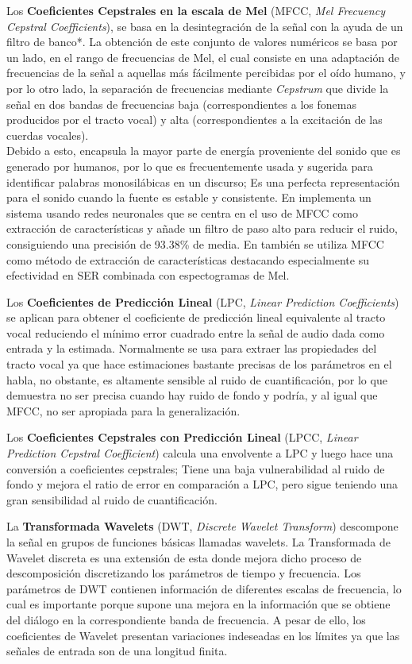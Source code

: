 \documentclass[11pt,a4paper,spanish]{book}
\begin{document}
	Los \textbf{Coeficientes Cepstrales en la escala de Mel} (MFCC, \emph{Mel Frecuency Cepstral Coefficients}), se basa en la desintegración de la señal con la ayuda de un filtro de banco*. La obtención de este conjunto de valores numéricos se basa por un lado, en el rango de frecuencias de Mel, el cual consiste en una adaptación de frecuencias de la señal a aquellas más fácilmente percibidas por el oído humano, y por lo otro lado, la separación de frecuencias mediante \emph{Cepstrum} que divide la señal en dos bandas de frecuencias baja (correspondientes a los fonemas producidos por el tracto vocal) y alta (correspondientes a la excitación de las cuerdas vocales).\\
	Debido a esto, encapsula la mayor parte de energía proveniente del sonido que es generado por humanos, por lo que es frecuentemente usada y sugerida para identificar palabras monosilábicas en un discurso; Es una perfecta representación para el sonido cuando la fuente es estable y consistente. En \cite{Sarkania2013} implementa un sistema usando redes neuronales que se centra en el uso de MFCC como extracción de características y añade un filtro  de paso alto para reducir el ruido, consiguiendo una precisión de 93.38\% de media. En \cite{Wang2020} también se utiliza MFCC como método de extracción de características destacando especialmente su efectividad en SER combinada con espectogramas de Mel.\hfill \break
	
	Los \textbf{Coeficientes de Predicción Lineal} (LPC, \emph{Linear Prediction Coefficients}) se aplican para obtener el coeficiente de predicción lineal equivalente al tracto vocal reduciendo el mínimo error cuadrado entre la señal de audio dada como entrada y la estimada. Normalmente se usa para extraer las propiedades del tracto vocal ya que hace estimaciones bastante precisas de los parámetros en el habla, no obstante, es altamente sensible al ruido de cuantificación, por lo que demuestra no ser precisa cuando hay ruido de fondo y podría, y al igual que MFCC, no ser apropiada para la generalización.\hfill \break
	
	 Los \textbf{Coeficientes Cepstrales con Predicción Lineal} (LPCC, \emph{Linear Prediction Cepstral Coefficient}) calcula una envolvente a LPC y luego hace una conversión a coeficientes cepstrales; Tiene una baja vulnerabilidad al ruido de fondo y mejora el ratio de error en comparación a LPC, pero sigue teniendo una gran sensibilidad al ruido de cuantificación.\hfill \break
	
	La \textbf{Transformada Wavelets} (DWT, \emph{Discrete Wavelet Transform}) descompone la señal en grupos de funciones básicas llamadas wavelets. La Transformada de Wavelet discreta es una extensión de esta donde mejora dicho proceso de descomposición discretizando los parámetros de tiempo y frecuencia. Los parámetros de DWT contienen información de diferentes escalas de frecuencia, lo cual es importante porque supone una mejora en la información que se obtiene del diálogo en la correspondiente banda de frecuencia. A pesar de ello, los coeficientes de Wavelet presentan variaciones indeseadas en los límites ya que las señales de entrada son de una longitud finita.\hfill \break
\end{document}
